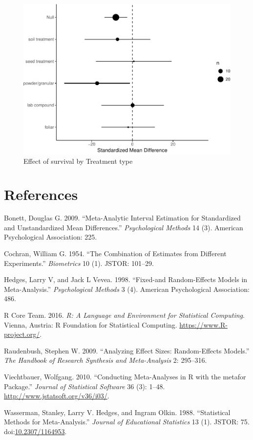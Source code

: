 \documentclass[]{elsarticle} %
\makeatletter
\def\maxwidth{\ifdim\Gin@nat@width>\linewidth\linewidth
\else\Gin@nat@width\fi}
\let\Oldincludegraphics\includegraphics
\renewcommand{\includegraphics}[1]{\Oldincludegraphics[width=\maxwidth]{#1}}
\makeatother
\begin{document}
\begin{figure}[htbp]
\centering
\includegraphics{MetanalysisNeonics_files/figure-latex/unnamed-chunk-31-1.pdf}
\caption{Effect of survival by Treatment type}
\end{figure}

\section*{References}\label{references}

Bonett, Douglas G. 2009. ``Meta-Analytic Interval Estimation for
Standardized and Unstandardized Mean Differences.'' \emph{Psychological
Methods} 14 (3). American Psychological Association: 225.

Cochran, William G. 1954. ``The Combination of Estimates from Different
Experiments.'' \emph{Biometrics} 10 (1). JSTOR: 101--29.

Hedges, Larry V, and Jack L Vevea. 1998. ``Fixed-and Random-Effects
Models in Meta-Analysis.'' \emph{Psychological Methods} 3 (4). American
Psychological Association: 486.

R Core Team. 2016. \emph{R: A Language and Environment for Statistical
Computing}. Vienna, Austria: R Foundation for Statistical Computing.
\url{https://www.R-project.org/}.

Raudenbush, Stephen W. 2009. ``Analyzing Effect Sizes: Random-Effects
Models.'' \emph{The Handbook of Research Synthesis and Meta-Analysis} 2:
295--316.

Viechtbauer, Wolfgang. 2010. ``Conducting Meta-Analyses in R with the
metafor Package.'' \emph{Journal of Statistical Software} 36 (3): 1--48.
\url{http://www.jstatsoft.org/v36/i03/}.

Wasserman, Stanley, Larry V. Hedges, and Ingram Olkin. 1988.
``Statistical Methods for Meta-Analysis.'' \emph{Journal of Educational
Statistics} 13 (1). JSTOR: 75.
doi:\href{http://dx.doi.org/10.2307/1164953}{10.2307/1164953}.
\end{document}
